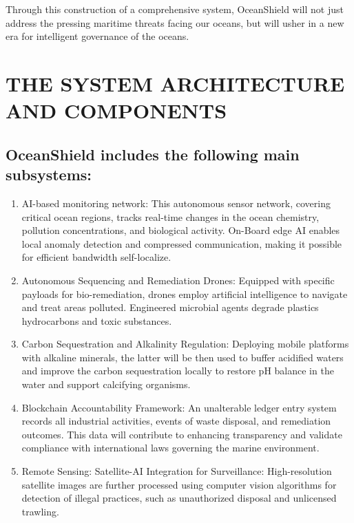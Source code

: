 \documentclass[a4paper]{article}
\begin{document}
Through this construction of a comprehensive system, OceanShield will not just address the pressing maritime threats facing our oceans, but will usher in a new era for intelligent governance of the oceans.

\section{THE SYSTEM ARCHITECTURE AND COMPONENTS}

\subsection{OceanShield includes the following main subsystems:}

\begin{enumerate}
    \item AI-based monitoring network: This autonomous sensor network, covering critical ocean regions, tracks real-time changes in the ocean chemistry, pollution concentrations, and biological activity. On-Board edge AI enables local anomaly detection and compressed communication, making it possible for efficient bandwidth self-localize.

    \item Autonomous Sequencing and Remediation Drones: Equipped with specific payloads for bio-remediation, drones employ artificial intelligence to navigate and treat areas polluted. Engineered microbial agents degrade plastics hydrocarbons and toxic substances.

    \item Carbon Sequestration and Alkalinity Regulation: Deploying mobile platforms with alkaline minerals, the latter will be then used to buffer acidified waters and improve the carbon sequestration locally to restore pH balance in the water and support calcifying organisms.

    \item Blockchain Accountability Framework: An unalterable ledger entry system records all industrial activities, events of waste disposal, and remediation outcomes. This data will contribute to enhancing transparency and validate compliance with international laws governing the marine environment.

    \item Remote Sensing: Satellite-AI Integration for Surveillance: High-resolution satellite images are further processed using computer vision algorithms for detection of illegal practices, such as unauthorized disposal and unlicensed trawling.


\end{enumerate}
\end{document}
